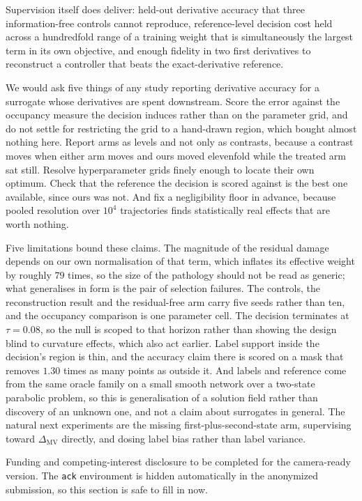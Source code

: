 \documentclass{article}
\begin{document}
Supervision itself does deliver: held-out derivative accuracy that three
information-free controls cannot reproduce, reference-level decision cost held
across a hundredfold range of a training weight that is simultaneously the largest
term in its own objective, and enough fidelity in two first derivatives to
reconstruct a controller that beats the exact-derivative reference.

We would ask five things of any study reporting derivative accuracy for a surrogate
whose derivatives are spent downstream. Score the error against the occupancy
measure the decision induces rather than on the parameter grid, and do not settle
for restricting the grid to a hand-drawn region, which bought almost nothing here.
Report arms as levels and not only as contrasts, because a contrast moves when
either arm moves and ours moved elevenfold while the treated arm sat still. Resolve
hyperparameter grids finely enough to locate their own optimum. Check that the
reference the decision is scored against is the best one available, since ours was
not. And fix a negligibility floor in advance, because pooled resolution over
$10^{4}$ trajectories finds statistically real effects that are worth nothing.

Five limitations bound these claims. The magnitude of the residual damage depends on
our own normalisation of that term, which inflates its effective weight by roughly
$79$ times, so the size of the pathology should not be read as generic; what
generalises in form is the pair of selection failures. The controls, the
reconstruction result and the residual-free arm carry five seeds rather than ten,
and the occupancy comparison is one parameter cell. The decision terminates at
$\tau = 0.08$, so the null is scoped to that horizon rather than showing the design
blind to curvature effects, which also act earlier. Label support inside the
decision's region is thin, and the accuracy claim there is scored on a mask that
removes $1.30$ times as many points as outside it. And labels and reference come
from the same oracle family on a small smooth network over a two-state parabolic
problem, so this is generalisation of a solution field rather than discovery of an
unknown one, and not a claim about surrogates in general. The natural next
experiments are the missing first-plus-second-state arm, supervising toward
$\Delta_{\mathrm{MV}}$ directly, and dosing label bias rather than label variance.

\begin{ack}
Funding and competing-interest disclosure to be completed for the camera-ready
version. The \texttt{ack} environment is hidden automatically in the anonymized
submission, so this section is safe to fill in now.
\end{ack}
\end{document}

